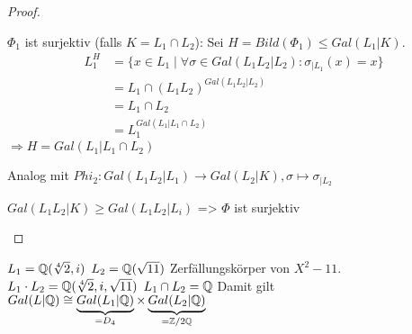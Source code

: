 \documentclass[../main.tex]{subfiles}
\begin{document}
\begin{proof}
\begin{description}
        $\Phi_1$ ist surjektiv (falls $K = L_1 \cap L_2$):
        Sei $H=Bild(\Phi_1)\leq Gal(L_1|K)$.
        \begin{align*}
            L_1^H&=\{x\in L_1\mid\forall \sigma\in Gal(L_1L_2|L_2)\colon \sigma_{|L_1}(x) = x\}\\
            &= L_1\cap (L_1L_2)^{Gal(L_1L_2|L_2)}\\
            &= L_1\cap L_2\\
            &= L_1^{Gal(L_1|L_1\cap L_2)}
        \end{align*}
         $\Rightarrow H= Gal(L_1|L_1\cap L_2)$
    
        Analog mit $Phi_2: Gal(L_1L_2|L_1)\rightarrow Gal(L_2|K), \sigma \mapsto \sigma_{|L_2}$
    
        $Gal(L_1L_2|K)\geq Gal(L_1L_2|L_i)$ => $\Phi$ ist surjektiv
    \end{description}
\end{proof}
\begin{example}
    $L_1=\mathbb{Q}(\sqrt[4]{2},i)$
    $L_2=\mathbb{Q}(\sqrt{11})$ Zerfällungskörper von $X^2-11$.
    $L_1\cdot L_2 = \mathbb{Q}(\sqrt[4]{2},i,\sqrt{11})$
    $L_1\cap L_2 = \mathbb{Q}$
    Damit gilt $Gal(L|\mathbb{Q})\cong \underbrace{Gal(L_1|\mathbb{Q})}_{=D_4}\times \underbrace{Gal(L_2|\mathbb{Q})}_{=\mathbb{Z}/2\mathbb{Q}}$
\end{example}
\end{document}
